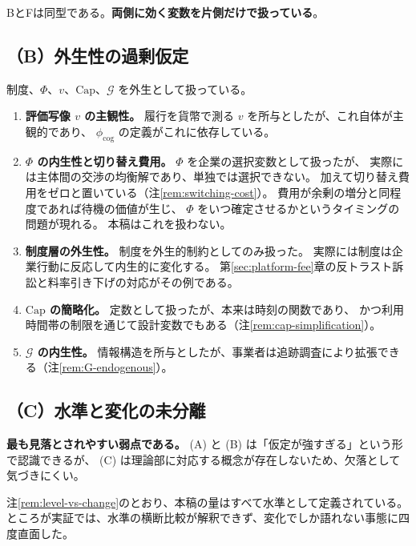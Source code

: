 BとFは同型である。\textbf{両側に効く変数を片側だけで扱っている}。

\subsection{（B）外生性の過剰仮定}

制度、$\Phi$、$v$、$\mathrm{Cap}$、$\mathcal{G}$ を外生として扱っている。

\begin{enumerate}[label=(\arabic*)]
\item \textbf{評価写像 $v$ の主観性。}
履行を貨幣で測る $v$ を所与としたが、これ自体が主観的であり、
$\phi_{\mathrm{cog}}$ の定義がこれに依存している。

\item \textbf{$\Phi$ の内生性と切り替え費用。}
$\Phi$ を企業の選択変数として扱ったが、
実際には主体間の交渉の均衡解であり、単独では選択できない。
加えて切り替え費用をゼロと置いている（注\ref{rem:switching-cost}）。
費用が余剰の増分と同程度であれば待機の価値が生じ、
$\Phi$ をいつ確定させるかというタイミングの問題が現れる。
本稿はこれを扱わない。

\item \textbf{制度層の外生性。}
制度を外生的制約としてのみ扱った。
実際には制度は企業行動に反応して内生的に変化する。
第\ref{sec:platform-fee}章の反トラスト訴訟と料率引き下げの対応がその例である。

\item \textbf{$\mathrm{Cap}$ の簡略化。}
定数として扱ったが、本来は時刻の関数であり、
かつ利用時間帯の制限を通じて設計変数でもある（注\ref{rem:cap-simplification}）。

\item \textbf{$\mathcal{G}$ の内生性。}
情報構造を所与としたが、事業者は追跡調査により拡張できる（注\ref{rem:G-endogenous}）。
\end{enumerate}

\subsection{（C）水準と変化の未分離}
\label{sec:level-change-gap}

\textbf{最も見落とされやすい弱点である。}
(A) と (B) は「仮定が強すぎる」という形で認識できるが、
(C) は理論部に対応する概念が存在しないため、欠落として気づきにくい。

注\ref{rem:level-vs-change}のとおり、本稿の量はすべて水準として定義されている。
ところが実証では、水準の横断比較が解釈できず、変化でしか語れない事態に四度直面した。

